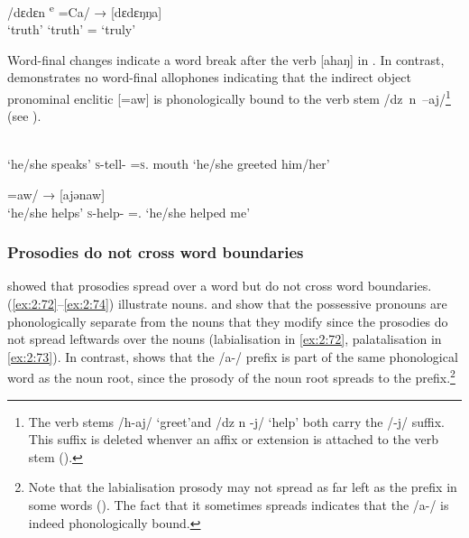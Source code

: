 \ea \label{ex:2:69}
\gll [dedeŋ]  {\ExampleSpace}  {/dɛdɛn \textsuperscript{e}}   =Ca/  → \hspace{2pt}  [dɛdɛŋŋa]\\
      ‘truth’   {}   ‘truth’                     ={\ADJ}  {} {}  ‘truly’\\
\z

Word-final changes indicate a word break after the verb [ahaŋ] in . In contrast,  demonstrates no word-final allophones indicating that the indirect object pronominal enclitic [=aw] is phonologically bound to the verb stem \mbox{/dz n –aj/}\footnote{The verb stems /h-aj/ ‘greet’and /dz n -j/  ‘help’ both carry the /-j/ suffix. This suffix is deleted whenver an affix or extension is attached to the verb stem ().} (see ).

\ea \label{ex:2:70}
\\
     {‘he/she speaks’}  \textsc{s}-tell-{\CL}  =\textsc{s}.{\IO}  mouth     {}      {‘he/she greeted him/her’}\\
\z

\ea \label{ex:2:71}
        =aw/   \hspace{30pt}     →   [ajənaw]\\
       {‘he/she helps’}  \textsc{s}-help-{\CL}  ={\oneS}.{\IO}  {} {}  {‘he/she helped me’}\\
\z

\subsubsection{Prosodies do not cross word boundaries}\label{sec:2.6.1.3}

\citet{Bow1997c} showed that prosodies spread over a word but do not cross word boundaries. (\ref{ex:2:72}--\ref{ex:2:74}) illustrate nouns.  and  show that the possessive pronouns are phonologically separate from the nouns that they modify since the prosodies do not spread leftwards over the nouns (labialisation in \ref{ex:2:72}, palatalisation in \ref{ex:2:73}). In contrast,  shows that the /a-/ prefix is part of the same phonological word as the noun root, since the prosody of the noun root spreads to the prefix.\footnote{Note that the labialisation prosody may not spread as far left as the prefix in some words (). The fact that it sometimes spreads indicates that the /a-/ is indeed phonologically bound. } 
 

